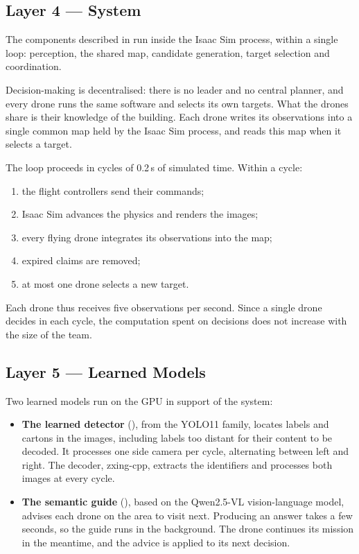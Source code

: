 \subsection*{Layer 4 --- System}

The components described in  run inside the Isaac Sim process,
within a single loop: perception, the shared map, candidate generation, target
selection and coordination.

Decision-making is decentralised: there is no leader and no central planner, and
every drone runs the same software and selects its own targets. What the drones
share is their knowledge of the building. Each drone writes its observations into
a single common map held by the Isaac Sim process, and reads this map when it
selects a target.

The loop proceeds in cycles of 0.2\,s of simulated time. Within a cycle:

\begin{enumerate}[itemsep=0.2em]
    \item the flight controllers send their commands;
    \item Isaac Sim advances the physics and renders the images;
    \item every flying drone integrates its observations into the map;
    \item expired claims are removed;
    \item at most one drone selects a new target.
\end{enumerate}

Each drone thus receives five observations per second. Since a single drone
decides in each cycle, the computation spent on decisions does not increase with
the size of the team.

\subsection*{Layer 5 --- Learned Models}

Two learned models run on the GPU in support of the system:

\begin{itemize}[itemsep=0.35em]
    \item \textbf{The learned detector} (), from the YOLO11 family,
          locates  labels and cartons in the images, including
          labels too distant for their content to be decoded. It processes one side
          camera per cycle, alternating between left and right. The decoder,
          zxing-cpp, extracts the identifiers and processes both images at every
          cycle.
    \item \textbf{The semantic guide} (), based on the Qwen2.5-VL
          vision-language model, advises each drone on the area to visit next.
          Producing an answer takes a few seconds, so the guide runs in the
          background. The drone continues its mission in the meantime, and the
          advice is applied to its next decision.
\end{itemize}

